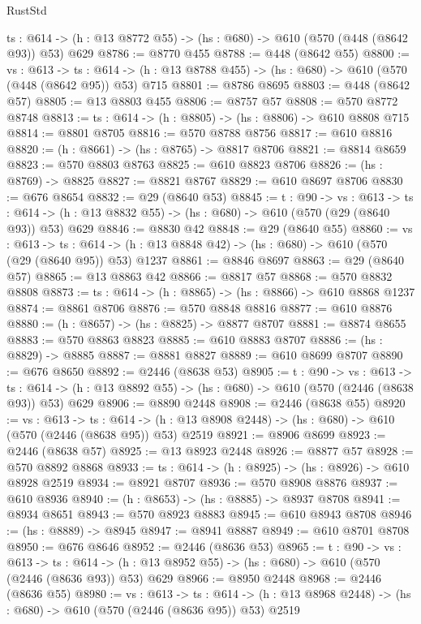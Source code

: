 \begin{lexlean}{RustStd}
\begin{coremodule}
  {ts : @614} -> (h : @13 @8772 @55) -> (hs : @680) -> @610 (@570 (@448 (@8642 @93)) @53) @629
@8786 := @8770 @455
@8788 := @448 (@8642 @55)
@8800 := {vs : @613} ->
  {ts : @614} -> (h : @13 @8788 @455) -> (hs : @680) -> @610 (@570 (@448 (@8642 @95)) @53) @715
@8801 := @8786 @8695
@8803 := @448 (@8642 @57)
@8805 := @13 @8803 @455
@8806 := @8757 @57
@8808 := @570 @8772 @8748
@8813 := {ts : @614} -> (h : @8805) -> (hs : @8806) -> @610 @8808 @715
@8814 := @8801 @8705
@8816 := @570 @8788 @8756
@8817 := @610 @8816
@8820 := (h : @8661) -> (hs : @8765) -> @8817 @8706
@8821 := @8814 @8659
@8823 := @570 @8803 @8763
@8825 := @610 @8823 @8706
@8826 := (hs : @8769) -> @8825
@8827 := @8821 @8767
@8829 := @610 @8697 @8706
@8830 := @676 @8654
@8832 := @29 (@8640 @53)
@8845 := {t : @90} ->
  {vs : @613} ->
  {ts : @614} -> (h : @13 @8832 @55) -> (hs : @680) -> @610 (@570 (@29 (@8640 @93)) @53) @629
@8846 := @8830 @42
@8848 := @29 (@8640 @55)
@8860 := {vs : @613} ->
  {ts : @614} -> (h : @13 @8848 @42) -> (hs : @680) -> @610 (@570 (@29 (@8640 @95)) @53) @1237
@8861 := @8846 @8697
@8863 := @29 (@8640 @57)
@8865 := @13 @8863 @42
@8866 := @8817 @57
@8868 := @570 @8832 @8808
@8873 := {ts : @614} -> (h : @8865) -> (hs : @8866) -> @610 @8868 @1237
@8874 := @8861 @8706
@8876 := @570 @8848 @8816
@8877 := @610 @8876
@8880 := (h : @8657) -> (hs : @8825) -> @8877 @8707
@8881 := @8874 @8655
@8883 := @570 @8863 @8823
@8885 := @610 @8883 @8707
@8886 := (hs : @8829) -> @8885
@8887 := @8881 @8827
@8889 := @610 @8699 @8707
@8890 := @676 @8650
@8892 := @2446 (@8638 @53)
@8905 := {t : @90} ->
  {vs : @613} ->
  {ts : @614} -> (h : @13 @8892 @55) -> (hs : @680) -> @610 (@570 (@2446 (@8638 @93)) @53) @629
@8906 := @8890 @2448
@8908 := @2446 (@8638 @55)
@8920 := {vs : @613} ->
  {ts : @614} -> (h : @13 @8908 @2448) -> (hs : @680) -> @610 (@570 (@2446 (@8638 @95)) @53) @2519
@8921 := @8906 @8699
@8923 := @2446 (@8638 @57)
@8925 := @13 @8923 @2448
@8926 := @8877 @57
@8928 := @570 @8892 @8868
@8933 := {ts : @614} -> (h : @8925) -> (hs : @8926) -> @610 @8928 @2519
@8934 := @8921 @8707
@8936 := @570 @8908 @8876
@8937 := @610 @8936
@8940 := (h : @8653) -> (hs : @8885) -> @8937 @8708
@8941 := @8934 @8651
@8943 := @570 @8923 @8883
@8945 := @610 @8943 @8708
@8946 := (hs : @8889) -> @8945
@8947 := @8941 @8887
@8949 := @610 @8701 @8708
@8950 := @676 @8646
@8952 := @2446 (@8636 @53)
@8965 := {t : @90} ->
  {vs : @613} ->
  {ts : @614} -> (h : @13 @8952 @55) -> (hs : @680) -> @610 (@570 (@2446 (@8636 @93)) @53) @629
@8966 := @8950 @2448
@8968 := @2446 (@8636 @55)
@8980 := {vs : @613} ->
  {ts : @614} -> (h : @13 @8968 @2448) -> (hs : @680) -> @610 (@570 (@2446 (@8636 @95)) @53) @2519

\end{coremodule}
\end{lexlean}

